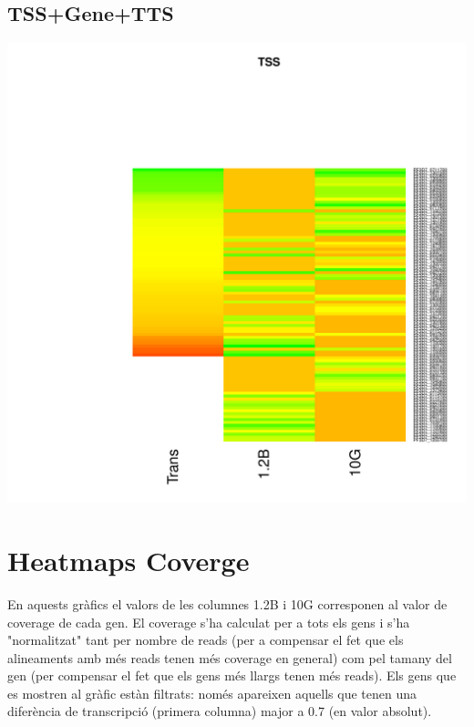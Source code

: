 \documentclass{article}\usepackage[]{graphicx}\usepackage[]{color}
\newenvironment{knitrout}{}{} %
\begin{document}
\subsection{TSS+Gene+TTS}
\begin{knitrout}
\color{fgcolor}

{\centering \includegraphics[width=.9\linewidth]{figure/minimal-heatmap_all-1} 

}



\end{knitrout}

\clearpage
\section{Heatmaps Coverge}
En aquests gràfics el valors de les columnes 1.2B i 10G corresponen al valor de coverage de cada gen. El coverage s'ha calculat per a tots els gens i s'ha "normalitzat" tant per nombre de reads (per a compensar el fet que els alineaments amb més reads tenen més coverage en general) com pel tamany del gen (per compensar el fet que els gens més llargs tenen més reads). Els gens que es mostren al gràfic estàn filtrats: només apareixen aquells que tenen una diferència de transcripció (primera columna) major a 0.7 (en valor absolut).
\end{document}
